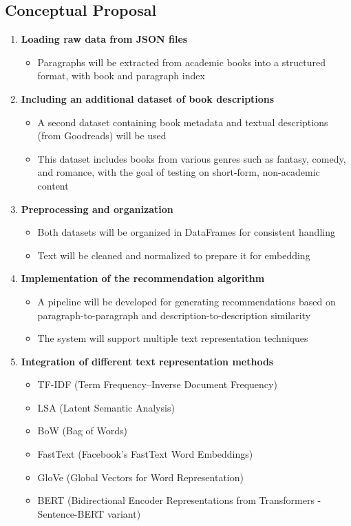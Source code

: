 \documentclass[\myFontSize,a4paper,oneside,english,hidelinks]{article}
\begin{document}
\subsection{Conceptual Proposal}
\begin{enumerate}
    \item \textbf{Loading raw data from JSON files}
    \begin{itemize}
        \item Paragraphs will be extracted from academic books into a structured format, with book and paragraph index
    \end{itemize}

    \item \textbf{Including an additional dataset of book descriptions}
    \begin{itemize}
        \item A second dataset containing book metadata and textual descriptions (from Goodreads) will be used
        \item This dataset includes books from various genres such as fantasy, comedy, and romance, with the goal of testing on short-form, non-academic content
    \end{itemize}

    \item \textbf{Preprocessing and organization}
    \begin{itemize}
        \item Both datasets will be organized in DataFrames for consistent handling
        \item Text will be cleaned and normalized to prepare it for embedding
    \end{itemize}
    
    \item \textbf{Implementation of the recommendation algorithm}
    \begin{itemize}
        \item A pipeline will be developed for generating recommendations based on paragraph-to-paragraph and description-to-description similarity
        \item The system will support multiple text representation techniques
    \end{itemize}

    \item \textbf{Integration of different text representation methods}
    \begin{itemize}
	\item TF-IDF (Term Frequency–Inverse Document Frequency)
	\item LSA (Latent Semantic Analysis)
	\item BoW (Bag of Words)
	\item FastText (Facebook's FastText Word Embeddings)
	\item GloVe (Global Vectors for Word Representation)
	\item BERT (Bidirectional Encoder Representations from Transformers - Sentence-BERT variant)
    \end{itemize}



\end{enumerate}
\end{document}
